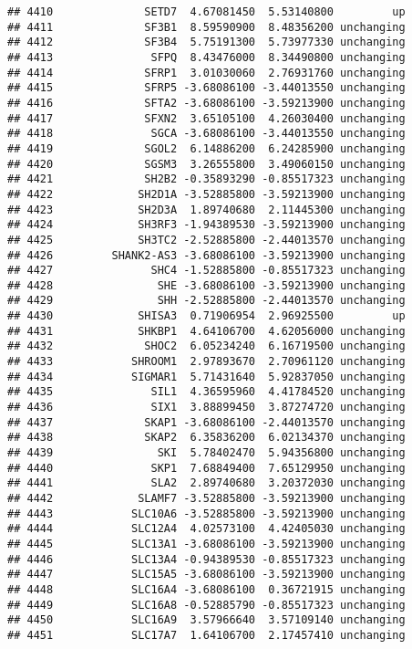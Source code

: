\documentclass[]{article}
\begin{document}
\begin{verbatim}
## 4410              SETD7  4.67081450  5.53140800         up
## 4411              SF3B1  8.59590900  8.48356200 unchanging
## 4412              SF3B4  5.75191300  5.73977330 unchanging
## 4413               SFPQ  8.43476000  8.34490800 unchanging
## 4414              SFRP1  3.01030060  2.76931760 unchanging
## 4415              SFRP5 -3.68086100 -3.44013550 unchanging
## 4416              SFTA2 -3.68086100 -3.59213900 unchanging
## 4417              SFXN2  3.65105100  4.26030400 unchanging
## 4418               SGCA -3.68086100 -3.44013550 unchanging
## 4419              SGOL2  6.14886200  6.24285900 unchanging
## 4420              SGSM3  3.26555800  3.49060150 unchanging
## 4421              SH2B2 -0.35893290 -0.85517323 unchanging
## 4422             SH2D1A -3.52885800 -3.59213900 unchanging
## 4423             SH2D3A  1.89740680  2.11445300 unchanging
## 4424             SH3RF3 -1.94389530 -3.59213900 unchanging
## 4425             SH3TC2 -2.52885800 -2.44013570 unchanging
## 4426         SHANK2-AS3 -3.68086100 -3.59213900 unchanging
## 4427               SHC4 -1.52885800 -0.85517323 unchanging
## 4428                SHE -3.68086100 -3.59213900 unchanging
## 4429                SHH -2.52885800 -2.44013570 unchanging
## 4430             SHISA3  0.71906954  2.96925500         up
## 4431             SHKBP1  4.64106700  4.62056000 unchanging
## 4432              SHOC2  6.05234240  6.16719500 unchanging
## 4433            SHROOM1  2.97893670  2.70961120 unchanging
## 4434            SIGMAR1  5.71431640  5.92837050 unchanging
## 4435               SIL1  4.36595960  4.41784520 unchanging
## 4436               SIX1  3.88899450  3.87274720 unchanging
## 4437              SKAP1 -3.68086100 -2.44013570 unchanging
## 4438              SKAP2  6.35836200  6.02134370 unchanging
## 4439                SKI  5.78402470  5.94356800 unchanging
## 4440               SKP1  7.68849400  7.65129950 unchanging
## 4441               SLA2  2.89740680  3.20372030 unchanging
## 4442             SLAMF7 -3.52885800 -3.59213900 unchanging
## 4443            SLC10A6 -3.52885800 -3.59213900 unchanging
## 4444            SLC12A4  4.02573100  4.42405030 unchanging
## 4445            SLC13A1 -3.68086100 -3.59213900 unchanging
## 4446            SLC13A4 -0.94389530 -0.85517323 unchanging
## 4447            SLC15A5 -3.68086100 -3.59213900 unchanging
## 4448            SLC16A4 -3.68086100  0.36721915 unchanging
## 4449            SLC16A8 -0.52885790 -0.85517323 unchanging
## 4450            SLC16A9  3.57966640  3.57109140 unchanging
## 4451            SLC17A7  1.64106700  2.17457410 unchanging

\end{verbatim}
\end{document}
